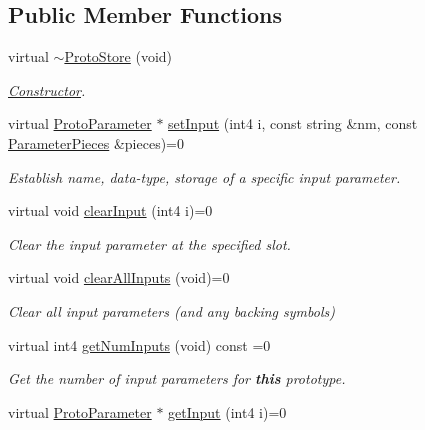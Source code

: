 \subsection*{Public Member Functions}
\begin{DoxyCompactItemize}
\item 
virtual \mbox{\hyperlink{class_proto_store_aefbc7f56e4d2f26b043bbdf74b6a8553}{$\sim$\+Proto\+Store}} (void)
\begin{DoxyCompactList}\small\item\em \mbox{\hyperlink{class_constructor}{Constructor}}. \end{DoxyCompactList}\item 
virtual \mbox{\hyperlink{class_proto_parameter}{Proto\+Parameter}} $\ast$ \mbox{\hyperlink{class_proto_store_af24924b3d08fedff7e55788f2b7a0043}{set\+Input}} (int4 i, const string \&nm, const \mbox{\hyperlink{struct_parameter_pieces}{Parameter\+Pieces}} \&pieces)=0
\begin{DoxyCompactList}\small\item\em Establish name, data-\/type, storage of a specific input parameter. \end{DoxyCompactList}\item 
virtual void \mbox{\hyperlink{class_proto_store_afa6361ac313cdd2ccef1531209389cdc}{clear\+Input}} (int4 i)=0
\begin{DoxyCompactList}\small\item\em Clear the input parameter at the specified slot. \end{DoxyCompactList}\item 
virtual void \mbox{\hyperlink{class_proto_store_a2b2eab8f123a06bb4f4619e039bb1106}{clear\+All\+Inputs}} (void)=0
\begin{DoxyCompactList}\small\item\em Clear all input parameters (and any backing symbols) \end{DoxyCompactList}\item 
virtual int4 \mbox{\hyperlink{class_proto_store_a641e1b680e3a7c67b65a964d06d60187}{get\+Num\+Inputs}} (void) const =0
\begin{DoxyCompactList}\small\item\em Get the number of input parameters for {\bfseries{this}} prototype. \end{DoxyCompactList}\item 
virtual \mbox{\hyperlink{class_proto_parameter}{Proto\+Parameter}} $\ast$ \mbox{\hyperlink{class_proto_store_a97623d0ed5720f94d7c671edccbd9142}{get\+Input}} (int4 i)=0

\end{DoxyCompactItemize}
